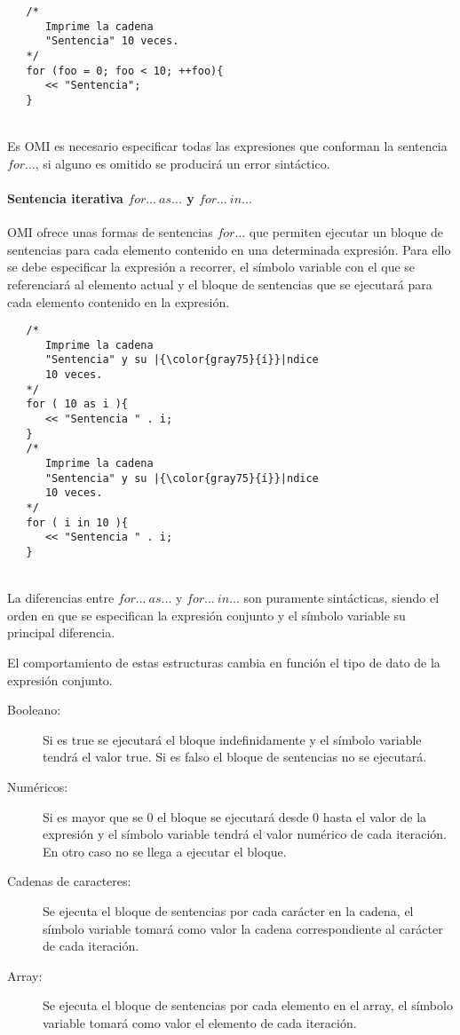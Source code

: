 \begin{lstlisting}
   /*
      Imprime la cadena 
      "Sentencia" 10 veces.
   */
   for (foo = 0; foo < 10; ++foo){
      << "Sentencia"; 
   }
\end{lstlisting}
\hfill\\

Es OMI es necesario especificar todas las expresiones que conforman la sentencia $for...$, si alguno es omitido se
producirá un error sintáctico.


\paragraph{Sentencia iterativa $for...\ as...$ y $for...\ in...$} \label{sec:stmt_foreach}

OMI ofrece unas formas de sentencias $for...$ que permiten ejecutar un bloque de sentencias para cada elemento contenido 
en una determinada expresión. Para ello se debe especificar la expresión a recorrer, el símbolo variable con el 
que se referenciará al elemento actual y el bloque de sentencias que se ejecutará para cada elemento contenido 
en la expresión. \\


\begin{lstlisting}
   /*
      Imprime la cadena 
      "Sentencia" y su |{\color{gray75}{í}}|ndice 
      10 veces.
   */
   for ( 10 as i ){
      << "Sentencia " . i; 
   }
   /*
      Imprime la cadena 
      "Sentencia" y su |{\color{gray75}{í}}|ndice
      10 veces.
   */
   for ( i in 10 ){
      << "Sentencia " . i; 
   }
\end{lstlisting}
\hfill\\

La diferencias entre $for...\ as...$ y $for...\ in...$ son puramente sintácticas, siendo el orden en que se especifican la expresión conjunto y el
símbolo variable su principal diferencia.

El comportamiento de estas estructuras cambia en función el tipo de dato de la expresión conjunto. 

\begin{description}
\item [Booleano:] Si es true se ejecutará el bloque indefinidamente y el símbolo variable tendrá el valor true. Si es falso el bloque de sentencias no se ejecutará.
\item [Numéricos:] Si es mayor que se $0$ el bloque se ejecutará desde 0 hasta el valor de la expresión y el símbolo variable tendrá el valor numérico de cada iteración.
En otro caso no se llega a ejecutar el bloque.
\item [Cadenas de caracteres:] Se ejecuta el bloque de sentencias por cada carácter en la cadena, el símbolo variable tomará como valor la cadena correspondiente al 
carácter de cada iteración.
\item [Array:] Se ejecuta el bloque de sentencias por cada elemento en el array, el símbolo variable tomará como valor el elemento de cada iteración.
\end{description} 

